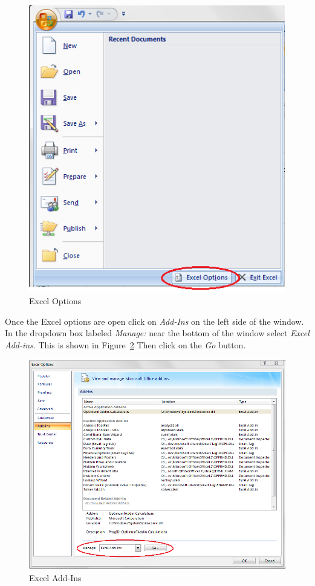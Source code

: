 \begin{figure}[H]
	\centering
		\includegraphics[width=.75\textwidth]{ExcelOptions.png}
	\caption{Excel Options}
	\label{fig:ExcelOptions}
\end{figure}

Once the Excel options are open click on \textit{Add-Ins} on the left side of the window. In the dropdown box labeled \textit{Manage:} near the bottom of the window select \textit{Excel Add-ins}. This is shown in Figure~\ref{fig:ExcelAddins} Then click on the \textit{Go} button. 

\begin{figure}[H]
	\centering
		\includegraphics[width=1.0\textwidth]{ExcelAddins.png}
	\caption{Excel Add-Ins}
	\label{fig:ExcelAddins}
\end{figure}

